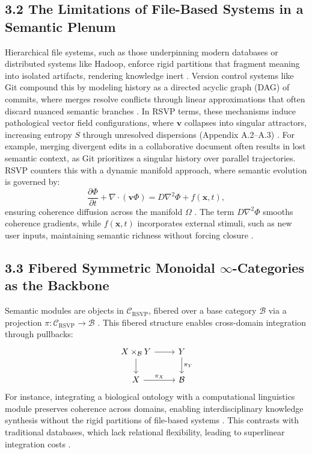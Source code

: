 \documentclass[12pt]{article}
\begin{document}
\subsection*{3.2 The Limitations of File-Based Systems in a Semantic Plenum}
Hierarchical file systems, such as those underpinning modern databases or distributed systems like Hadoop, enforce rigid partitions that fragment meaning into isolated artifacts, rendering knowledge inert \citep{bird1988}. Version control systems like Git compound this by modeling history as a directed acyclic graph (DAG) of commits, where merges resolve conflicts through linear approximations that often discard nuanced semantic branches \citep{bird1988}. In RSVP terms, these mechanisms induce pathological vector field configurations, where \(\mathbf{v}\) collapses into singular attractors, increasing entropy \(S\) through unresolved dispersions (Appendix A.2--A.3) \citep{cover2006}. For example, merging divergent edits in a collaborative document often results in lost semantic context, as Git prioritizes a singular history over parallel trajectories.
RSVP counters this with a dynamic manifold approach, where semantic evolution is governed by:
\[
\frac{\partial \Phi}{\partial t} + \nabla \cdot (\mathbf{v} \Phi) = D \nabla^2 \Phi + f(\mathbf{x}, t),
\]
ensuring coherence diffusion across the manifold \(\Omega\) \citep{gromov1999}. The term \(D \nabla^2 \Phi\) smooths coherence gradients, while \(f(\mathbf{x}, t)\) incorporates external stimuli, such as new user inputs, maintaining semantic richness without forcing closure \citep{jaynes2003}.
\subsection*{3.3 Fibered Symmetric Monoidal \(\infty\)-Categories as the Backbone}
Semantic modules are objects in \(\mathcal{C}_{\text{RSVP}}\), fibered over a base category \(\mathcal{B}\) via a projection \(\pi: \mathcal{C}_{\text{RSVP}} \to \mathcal{B}\) \citep{lawvere2009}. This fibered structure enables cross-domain integration through pullbacks:
\[
\begin{tikzcd}
X \times_{\mathcal{B}} Y \arrow[r] \arrow[d] & Y \arrow[d, "\pi_Y"] \\
X \arrow[r, "\pi_X"] & \mathcal{B}
\end{tikzcd}
\]
For instance, integrating a biological ontology with a computational linguistics module preserves coherence across domains, enabling interdisciplinary knowledge synthesis without the rigid partitions of file-based systems \citep{maclane1998}. This contrasts with traditional databases, which lack relational flexibility, leading to superlinear integration costs \citep{bird1988}.
\end{document}
